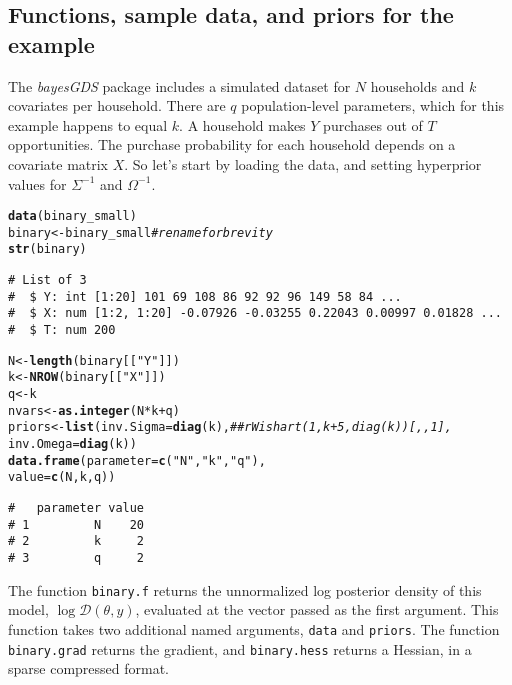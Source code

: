 \documentclass[10pt]{article}\usepackage[]{graphicx}\usepackage[]{color}
\makeatletter
\newcommand{\hlstr}[1]{\textcolor[rgb]{0.192,0.494,0.8}{#1}}%
\newcommand{\hlcom}[1]{\textcolor[rgb]{0.678,0.584,0.686}{\textit{#1}}}%
\newcommand{\hlopt}[1]{\textcolor[rgb]{0,0,0}{#1}}%
\newcommand{\hlstd}[1]{\textcolor[rgb]{0.345,0.345,0.345}{#1}}%
\newcommand{\hlkwb}[1]{\textcolor[rgb]{0.69,0.353,0.396}{#1}}%
\newcommand{\hlkwc}[1]{\textcolor[rgb]{0.333,0.667,0.333}{#1}}%
\newcommand{\hlkwd}[1]{\textcolor[rgb]{0.737,0.353,0.396}{\textbf{#1}}}%
\newenvironment{kframe}{%
 \def\at@end@of@kframe{}%
 \ifinner\ifhmode%
  \def\at@end@of@kframe{\end{minipage}}%
  \begin{minipage}{\columnwidth}%
 \fi\fi%
 \def\FrameCommand##1{\hskip\@totalleftmargin \hskip-\fboxsep
 \colorbox{shadecolor}{##1}\hskip-\fboxsep
     \hskip-\linewidth \hskip-\@totalleftmargin \hskip\columnwidth}%
 \MakeFramed {\advance\hsize-\width
   \@totalleftmargin\z@ \linewidth\hsize
   \@setminipage}}%
 {\par\unskip\endMakeFramed%
 \at@end@of@kframe}
\newenvironment{knitrout}{}{} %
\renewenvironment{knitrout}{\begin{singlespace}}{\end{singlespace}}
\newcommand{\pkg}[1]{\emph{#1}}
\newcommand{\func}[1]{\texttt{#1}}
\newcommand{\funcarg}[1]{\texttt{#1}}
\newcommand{\Dy}{\mathcal{D}(\theta,y)}
\makeatother
\begin{document}
\subsection{Functions, sample data, and priors for the example}

The \pkg{bayesGDS} package includes a simulated dataset for $N$ households and $k$
covariates per household.  There are $q$ population-level parameters,
which for this example happens to equal $k$.  A household makes $Y$ purchases out of $T$
opportunities.  The purchase probability for each household depends on
a covariate matrix $X$.  So let's start by loading the data, and setting hyperprior values for $\Sigma^{-1}$ and $\Omega^{-1}$.

\begin{knitrout}
\color{fgcolor}\begin{kframe}
\begin{alltt}
\hlkwd{data}\hlstd{(binary_small)}
\hlstd{binary} \hlkwb{<-} \hlstd{binary_small} \hlcom{#rename for brevity}
\hlkwd{str}\hlstd{(binary)}
\end{alltt}
\begin{verbatim}
# List of 3
#  $ Y: int [1:20] 101 69 108 86 92 92 96 149 58 84 ...
#  $ X: num [1:2, 1:20] -0.07926 -0.03255 0.22043 0.00997 0.01828 ...
#  $ T: num 200
\end{verbatim}
\begin{alltt}
\hlstd{N} \hlkwb{<-} \hlkwd{length}\hlstd{(binary[[}\hlstr{"Y"}\hlstd{]])}
\hlstd{k} \hlkwb{<-} \hlkwd{NROW}\hlstd{(binary[[}\hlstr{"X"}\hlstd{]])}
\hlstd{q} \hlkwb{<-} \hlstd{k}
\hlstd{nvars} \hlkwb{<-} \hlkwd{as.integer}\hlstd{(N}\hlopt{*}\hlstd{k} \hlopt{+} \hlstd{q)}
\hlstd{priors} \hlkwb{<-} \hlkwd{list}\hlstd{(}\hlkwc{inv.Sigma} \hlstd{=} \hlkwd{diag}\hlstd{(k),} \hlcom{##rWishart(1,k+5,diag(k))[,,1],}
               \hlkwc{inv.Omega} \hlstd{=} \hlkwd{diag}\hlstd{(k))}
\hlkwd{data.frame}\hlstd{(}\hlkwc{parameter} \hlstd{=} \hlkwd{c}\hlstd{(}\hlstr{"N"}\hlstd{,}\hlstr{"k"}\hlstd{,}\hlstr{"q"}\hlstd{),}
           \hlkwc{value} \hlstd{=}  \hlkwd{c}\hlstd{(N, k, q))}
\end{alltt}
\begin{verbatim}
#   parameter value
# 1         N    20
# 2         k     2
# 3         q     2
\end{verbatim}
\end{kframe}
\end{knitrout}


The function \func{binary.f} returns the unnormalized log
posterior density of this model, $\log\Dy$, evaluated at the vector passed as the
first argument.  This function takes two additional named arguments,
\funcarg{data} and \funcarg{priors}.  The
function \funcarg{binary.grad} returns the gradient, and \funcarg{binary.hess} returns a
Hessian, in a sparse compressed format.
\end{document}
